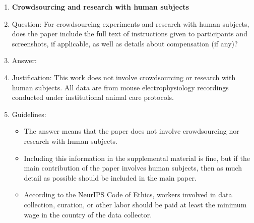 \begin{enumerate}
\item {\bf Crowdsourcing and research with human subjects}
    \item[] Question: For crowdsourcing experiments and research with human subjects, does the paper include the full text of instructions given to participants and screenshots, if applicable, as well as details about compensation (if any)? 
    \item[] Answer: \answerNA{}
    \item[] Justification: This work does not involve crowdsourcing
      or research with human subjects.  All data are from mouse
      electrophysiology recordings conducted under institutional
      animal care protocols.
    \item[] Guidelines:
    \begin{itemize}
        \item The answer \answerNA{} means that the paper does not involve crowdsourcing nor research with human subjects.
        \item Including this information in the supplemental material is fine, but if the main contribution of the paper involves human subjects, then as much detail as possible should be included in the main paper. 
        \item According to the NeurIPS Code of Ethics, workers involved in data collection, curation, or other labor should be paid at least the minimum wage in the country of the data collector. 
    \end{itemize}


\end{enumerate}
